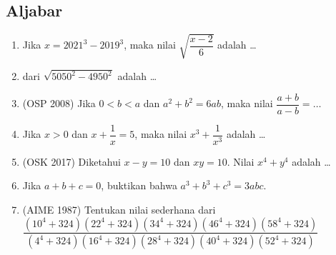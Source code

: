 \subsection{Aljabar}
\begin{enumerate}
    \item Jika $x=2021^3-2019^3$, maka nilai $\sqrt{\dfrac{x-2}{6}}$ adalah \dots
    \item  dari $\sqrt{5050^2-4950^2}$ adalah \dots

    \item (OSP 2008) Jika $0 < b < a$ dan $a^2+b^2=6ab$, maka nilai $\dfrac{a+b}{a-b}=\dots$
    
    \item Jika $x > 0$ dan $x + \dfrac{1}{x} =  5$, maka nilai $x^3+\dfrac{1}{x^3}$ adalah \dots
    
    \item (OSK 2017) Diketahui $x-y=10$ dan $xy=10$. Nilai $x^4+y^4$ adalah \dots
    
    \item Jika $a+b+c=0$, buktikan bahwa $a^3+b^3+c^3=3abc$.

    \item (AIME 1987)
    Tentukan nilai sederhana dari $\dfrac{(10^4+324)(22^4+324)(34^4+324)(46^4+324)(58^4+324)}{(4^4+324)(16^4+324)(28^4+324)(40^4+324)(52^4+324)}$
\end{enumerate}


